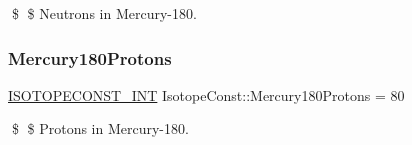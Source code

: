 \$ \$ Neutrons in Mercury-\/180. \mbox{\label{group___isotope_const-_mercury-_hg180_ga64c714ad1b9568511723c1d8d5888b5b}} 
\subsubsection{\texorpdfstring{Mercury180\+Protons}{Mercury180Protons}}
{\footnotesize\ttfamily \mbox{\hyperlink{group___isotope_const-_macros_ga5f18360b3e99483a35c32d789e62621c}{I\+S\+O\+T\+O\+P\+E\+C\+O\+N\+S\+T\+\_\+\+I\+NT}} Isotope\+Const\+::\+Mercury180\+Protons = 80}

\$ \$ Protons in Mercury-\/180. 